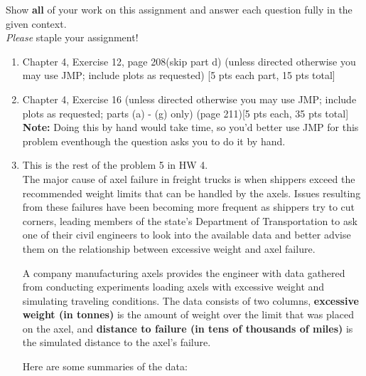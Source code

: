 \documentclass[11pt]{article}\usepackage[]{graphicx}\usepackage[]{color}
\begin{document}

\pagestyle{fancy} 

Show \textbf{all} of your work on this assignment and answer each question fully in the given context. \\


\emph{Please} staple your assignment!

\begin{enumerate}
	

	
	\item Chapter 4, Exercise 12, page 208(skip part d)  (unless directed otherwise you may use JMP; include plots as requested) [5 pts each part, 15 pts total]
	
	\item Chapter 4, Exercise 16 (unless directed otherwise you may use JMP; include plots as requested; parts (a) - (g) only) (page 211)[5 pts each, 35 pts total]\\
	\textbf{Note:} Doing this by hand would take time, so you'd better use JMP for this problem eventhough the question asks you to do it by hand.



\item
This is the rest of the problem 5 in HW 4.\\
The major cause of axel failure in freight trucks is when shippers exceed the recommended weight limits that can be handled by the axels. 
Issues resulting from these failures have been becoming more frequent as shippers try to cut corners, 
leading members of the state's Department of Transportation to ask one of their civil engineers 
to look into the available data and better advise them on the relationship between excessive weight and axel failure.

A company manufacturing axels provides the engineer with data gathered from conducting experiments loading axels with excessive weight and simulating traveling conditions.
The data consists of two columns, \textbf{excessive weight (in tonnes)} is the amount of weight over the limit that was placed on the axel, and 
\textbf{distance to failure (in tens of thousands of miles)} is the simulated distance to the axel's failure. 


\begin{center}
\end{center}


Here are some summaries of the data:


\end{enumerate}
\end{document}
